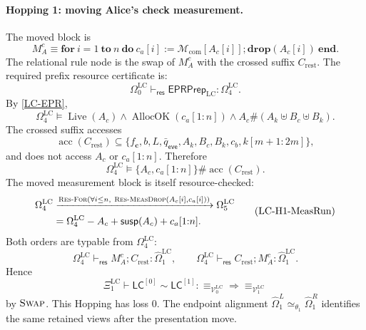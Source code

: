 \documentclass{report}
\theoremstyle{defn_style}
\providecommand{\Live}{\operatorname{Live}}
\providecommand{\AllocOK}{\operatorname{AllocOK}}
\providecommand{\acc}{\operatorname{acc}}
\providecommand{\susp}{\mathsf{susp}}
\providecommand{\HopLC}[1]{\mathsf{LC}^{[#1]}}
\begin{document}
\paragraph{Hopping 1: moving Alice's check measurement.}
The moved block is
\[
M_A^c
\equiv
\mathbf{for}\ i=1\ \mathbf{to}\ n\ \mathbf{do}\ 
c_a[i]:=\mathcal M_{\mathrm{com}}[A_c[i]];
\mathbf{drop}(A_c[i])
\ \mathbf{end}.
\]
The relational rule node is the swap of \(M_A^c\) with the crossed suffix
\(C_{\mathrm{rest}}\).  The required prefix resource certificate is:
\[
\Omega^{\mathrm{LC}}_0
\vdash_{\mathsf{res}}
\mathsf{EPRPrep}_{\mathrm{LC}}
:
\Omega^{\mathrm{LC}}_4 .
\tag{LC-H1-Prefix}\label{LC-H1-Prefix}
\]
By \eqref{LC-EPR},
\[
\Omega^{\mathrm{LC}}_4
\models
\Live(A_c)
\land
\AllocOK(c_a[1{:}n])
\land
A_c\#(A_k\uplus B_c\uplus B_k).
\]
The crossed suffix accesses
\[
\acc(C_{\mathrm{rest}})
\subseteq
\{f_{\mathbf c},b,L,\bar q_{\mathsf{eve}},A_k,B_c,B_k,c_b,k[m+1{:}2m]\},
\]
and does not access \(A_c\) or \(c_a[1{:}n]\).  Therefore
\[
\Omega^{\mathrm{LC}}_4
\models
\{A_c,c_a[1{:}n]\}\#\acc(C_{\mathrm{rest}}).
\tag{LC-H1-SwapReq}
\]
The moved measurement block is itself resource-checked:
\[
\begin{aligned}
\Omega^{\mathrm{LC}}_4
&\xrightarrow{
  \textsc{Res-For}
  \left(
    \forall i\le n,\ 
    \textsc{Res-MeasDrop}(A_c[i],c_a[i])
  \right)}
\Omega^{\mathrm{LC}}_5
\\
&=
\Omega^{\mathrm{LC}}_4
-A_c+\susp(A_c)+c_a[1{:}n].
\end{aligned}
\tag{LC-H1-MeasRun}
\]
Both orders are typable from \(\Omega^{\mathrm{LC}}_4\):
\[
\Omega^{\mathrm{LC}}_4
\vdash_{\mathsf{res}}
M_A^c;C_{\mathrm{rest}}:\widehat\Omega^{\mathrm{LC}}_1,
\qquad
\Omega^{\mathrm{LC}}_4
\vdash_{\mathsf{res}}
C_{\mathrm{rest}};M_A^c:\widehat\Omega^{\mathrm{LC}}_1.
\]
Hence
\[
\Xi^{\mathrm{LC}}_1
\vdash
\HopLC{0}\sim\HopLC{1}:
\equiv_{\mathcal V^{\mathrm{LC}}_0}
\Longrightarrow
\equiv_{\mathcal V^{\mathrm{LC}}_1}
\tag{LC-H1-Rel}
\]
by \(\textsc{Swap}\).  This Hopping has loss \(0\).  The endpoint
alignment \(\widehat\Omega_1^L\simeq_{\theta_1}\widehat\Omega_1^R\) identifies
the same retained views after the presentation move.
\end{document}
